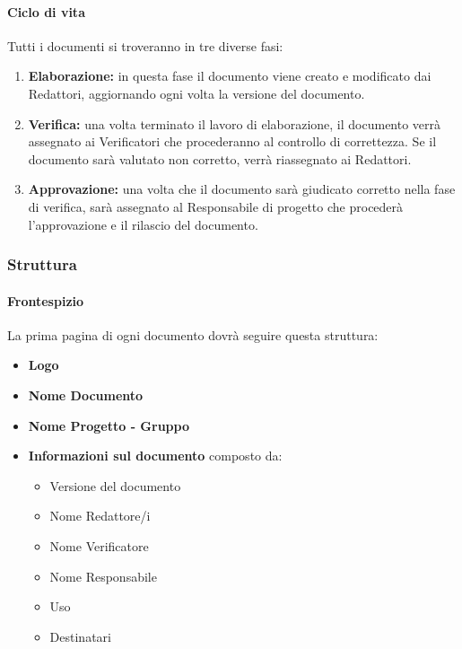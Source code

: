 \documentclass[11pt,a4paper]{article}
\begin{document}
{\begin{itemize}
	\end{itemize}
	
	\paragraph{Ciclo di vita\\}
	Tutti i documenti si troveranno in tre diverse fasi:
	\begin{enumerate}
		\item \textbf{Elaborazione:} in questa fase il documento viene creato e modificato dai Redattori, aggiornando ogni volta la versione del documento. 
		\item \textbf{Verifica:} una volta terminato il lavoro di elaborazione, il documento verrà assegnato ai Verificatori che procederanno al controllo di correttezza. Se il documento sarà valutato non corretto, verrà riassegnato ai Redattori.
		\item \textbf{Approvazione:} una volta che il documento sarà giudicato corretto nella fase di verifica, sarà assegnato al Responsabile di progetto che procederà l'approvazione e il rilascio del documento.
	\end{enumerate}
	
	\subsubsection{Struttura}
	
	\paragraph{Frontespizio} 
	La prima pagina di ogni documento dovrà seguire questa struttura:
	\begin{itemize}
		\item \textbf{Logo}
		\item \textbf{Nome Documento}
		\item \textbf{Nome Progetto - Gruppo}
		\item \textbf{Informazioni sul documento} composto da:
		\begin{itemize}
			\item  Versione del documento 
			\item Nome Redattore/i
			\item Nome Verificatore
			\item  Nome Responsabile
			\item  Uso
			\item Destinatari
		\end{itemize}
	\end{itemize}
	
}
\end{document}
